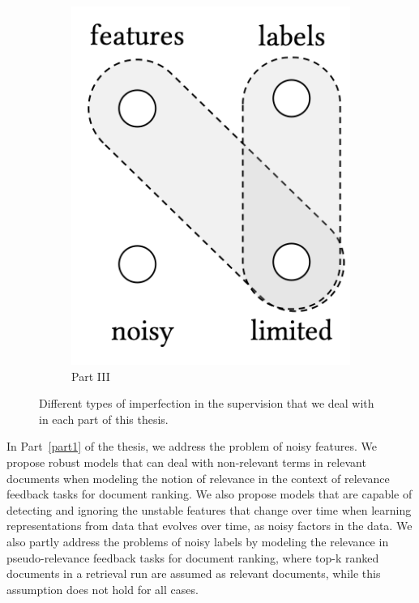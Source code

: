 \begin{figure}[t]
\begin{subfigure}[b]{0.32\textwidth}
    \centering
        \includegraphics[width=0.55\linewidth]{01-introduction/figs_and_tables/fig_p3.png}
        \caption{\label{fig:p3}Part III}
    \end{subfigure}
\caption{\label{fig:thesis_parts}Different types of imperfection in the supervision that we deal with in each part of this thesis.}
\end{figure}

In Part~\ref{part1} of the thesis, we address the problem of noisy features. We propose robust models that can deal with non-relevant terms in relevant documents when modeling the notion of relevance in the context of relevance feedback tasks for document ranking. We also propose models that are capable of detecting and ignoring the unstable features that change over time when learning representations from data that evolves over time, as noisy factors in the data. We also partly address the problems of noisy labels by modeling the relevance in pseudo-relevance feedback tasks for document ranking, where top-k ranked documents in a retrieval run are assumed as relevant documents, while this assumption does not hold for all cases.


